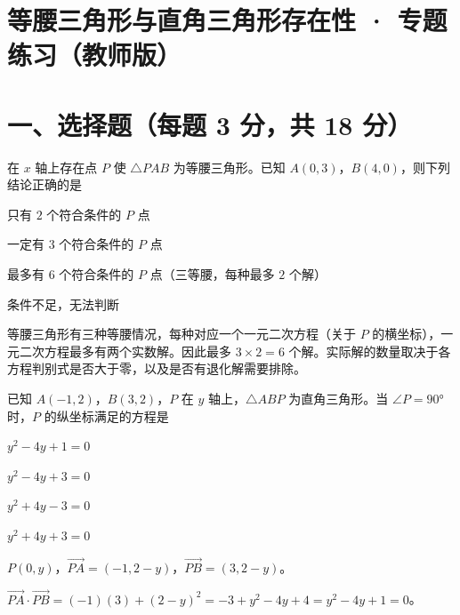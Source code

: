 \documentclass{exam-zh}
\begin{document}
\section*{等腰三角形与直角三角形存在性 · 专题练习（教师版）}

\section*{一、选择题（每题 3 分，共 18 分）}


\begin{question}[points=3]
  在 $x$ 轴上存在点 $P$ 使 $\triangle PAB$ 为等腰三角形。已知 $A(0,3)$，$B(4,0)$，则下列结论正确的是
  \begin{choices}
    \item 只有 $2$ 个符合条件的 $P$ 点
    \item 一定有 $3$ 个符合条件的 $P$ 点
    \item 最多有 $6$ 个符合条件的 $P$ 点（三等腰，每种最多 $2$ 个解）
    \item 条件不足，无法判断
  \end{choices}
  \paren[C]
  \begin{solutionblock}
    等腰三角形有三种等腰情况，每种对应一个一元二次方程（关于 $P$ 的横坐标），一元二次方程最多有两个实数解。因此最多 $3 \times 2 = 6$ 个解。实际解的数量取决于各方程判别式是否大于零，以及是否有退化解需要排除。
  \end{solutionblock}
\end{question}



\begin{question}[points=3]
  已知 $A(-1,2)$，$B(3,2)$，$P$ 在 $y$ 轴上，$\triangle ABP$ 为直角三角形。当 $\angle P = 90°$ 时，$P$ 的纵坐标满足的方程是
  \begin{choices}
    \item $y^2 - 4y + 1 = 0$
    \item $y^2 - 4y + 3 = 0$
    \item $y^2 + 4y - 3 = 0$
    \item $y^2 + 4y + 3 = 0$
  \end{choices}
  \paren[A]
  \begin{solutionblock}
    $P(0,y)$，$\overrightarrow{PA}=(-1,2-y)$，$\overrightarrow{PB}=(3,2-y)$。

$\overrightarrow{PA}\cdot\overrightarrow{PB}=(-1)(3)+(2-y)^2=-3+y^2-4y+4=y^2-4y+1=0$。
  \end{solutionblock}
\end{question}
\end{document}
